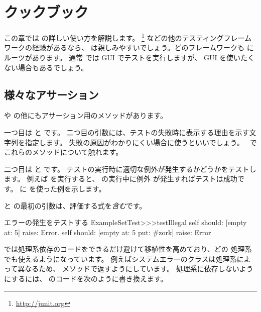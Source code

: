 \documentclass[a4paper,10pt,twoside]{book}
\begin{document}

\section{\SUnit クックブック}

この章では \SUnit の詳しい使い方を解説します。
\JUnit\footnote{\url{http://junit.org}} などの他のテスティングフレームワークの経験があるなら、 \SUnit は親しみやすいでしょう。どのフレームワークも \SUnit にルーツがあります。
通常 \SUnit では GUI でテストを実行しますが、 GUI を使いたくない場合もあるでしょう。

\subsection{様々なアサーション}

 や  の他にもアサーション用のメソッドがあります。

一つ目は  と  です。
二つ目の引数には、テストの失敗時に表示する理由を示す文字列を指定します。
失敗の原因がわかりにくい場合に使うといいでしょう。
~でこれらのメソッドについて触れます。

二つ目は  と  です。
テストの実行時に適切な例外が発生するかどうかをテストします。
例えば  を実行すると、  の実行中に例外  が発生すればテストは成功です。
 に \mbox{} を使った例を示します。


 と  の最初の引数は、評価する式を\emph{含む}です。

\begin{method}[ESTtestIllegal]{エラーの発生をテストする}
ExampleSetTest>>>testIllegal
	self should: [empty at: 5] raise: Error.
	self should: [empty at: 5 put: #zork] raise: Error
\end{method}

\sunit では処理系依存のコードをできるだけ避けて移植性を高めており、どの \st 処理系でも使えるようになっています。
例えばシステムエラーのクラスは処理系によって異なるため、  メソッドで返すようにしています。
処理系に依存しないようにするには、  のコードを次のように書き換えます。
\end{document}
